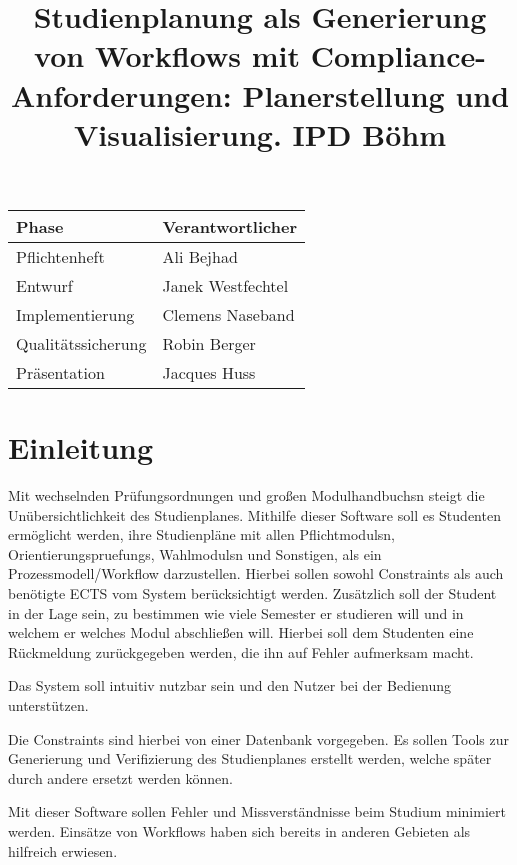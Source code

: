 \documentclass[parskip=full]{scrartcl}
\title{Studienplanung als Generierung von Workflows mit Compliance-Anforderungen: Planerstellung und Visualisierung.
	\newline IPD Böhm}
\begin{document}
	
	\maketitle
	\renewcommand{\arraystretch}{1.25}%
	\begin{center}
		\begin{tabular}{| l | l |}
			\hline
			\textbf{Phase} & \textbf{Verantwortlicher} \\
			\hline
			Pflichtenheft & Ali Bejhad \\
			Entwurf & Janek Westfechtel \\
			Implementierung & Clemens Naseband \\
			Qualitätssicherung & Robin Berger \\
			Präsentation  & Jacques Huss \\
			\hline
		\end{tabular}
	\end{center}
	
	\pagebreak
	\tableofcontents
	
	\section{Einleitung}
	
		Mit wechselnden Prüfungsordnungen und großen \glspl{Modulhandbuch}n steigt die Unübersichtlichkeit des Studienplanes. Mithilfe dieser Software soll es Studenten ermöglicht werden, ihre Studienpläne mit allen \glspl{Pflichtmodul}n, \glspl{Orientierungspruefung}, \glspl{Wahlmodul}n und Sonstigen, als ein Prozessmodell/\gls{Workflow} darzustellen. Hierbei sollen sowohl \glspl{Constraint} als auch benötigte \gls{ECTS} vom System berücksichtigt werden. Zusätzlich soll der Student in der Lage sein, zu bestimmen wie viele Semester er studieren will und in welchem er welches Modul abschließen will. Hierbei soll dem Studenten eine Rückmeldung zurückgegeben werden, die ihn auf Fehler aufmerksam macht.
	
		Das System soll intuitiv nutzbar sein und den Nutzer bei der Bedienung unterstützen.
	
		Die Constraints sind hierbei von einer Datenbank vorgegeben. 
		Es sollen Tools zur Generierung und Verifizierung des Studienplanes erstellt werden, welche später durch andere ersetzt werden können.
	
		Mit dieser Software sollen Fehler und Missverständnisse beim Studium minimiert werden. Einsätze von Workflows haben sich bereits in anderen Gebieten als hilfreich erwiesen.
	
\end{document}
